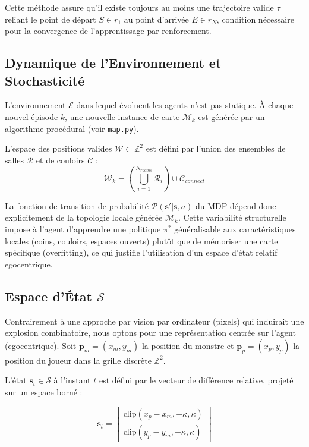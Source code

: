 \documentclass[12pt,a4paper]{article}
\newcommand{\state}{\mathbf{s}}
\newcommand{\action}{a}
\begin{document}
Cette méthode assure qu'il existe toujours au moins une trajectoire valide $\tau$ reliant le point de départ $S \in r_1$ au point d'arrivée $E \in r_N$, condition nécessaire pour la convergence de l'apprentissage par renforcement.

\subsection{Dynamique de l'Environnement et Stochasticité}
L'environnement $\mathcal{E}$ dans lequel évoluent les agents n'est pas statique. À chaque nouvel épisode $k$, une nouvelle instance de carte $\mathcal{M}_k$ est générée par un algorithme procédural (voir \texttt{map.py}).

L'espace des positions valides $\mathcal{W} \subset \mathbb{Z}^2$ est défini par l'union des ensembles de salles $\mathcal{R}$ et de couloirs $\mathcal{C}$ :
\begin{equation}
    \mathcal{W}_k = \left( \bigcup_{i=1}^{N_{rooms}} \mathcal{R}_i \right) \cup \mathcal{C}_{connect}
\end{equation}

La fonction de transition de probabilité $\mathcal{P}(\state'|\state, \action)$ du MDP dépend donc explicitement de la topologie locale générée $\mathcal{M}_k$. Cette variabilité structurelle impose à l'agent d'apprendre une politique $\pi^*$ généralisable aux caractéristiques locales (coins, couloirs, espaces ouverts) plutôt que de mémoriser une carte spécifique (overfitting), ce qui justifie l'utilisation d'un espace d'état relatif egocentrique.



\subsection{Espace d'État \texorpdfstring{$\mathcal{S}$}{S}}
Contrairement à une approche par vision par ordinateur (pixels) qui induirait une explosion combinatoire, nous optons pour une représentation centrée sur l'agent (egocentrique). Soit $\mathbf{p}_m = (x_m, y_m)$ la position du monstre et $\mathbf{p}_p = (x_p, y_p)$ la position du joueur dans la grille discrète $\mathbb{Z}^2$.

L'état $\state_t \in \mathcal{S}$ à l'instant $t$ est défini par le vecteur de différence relative, projeté sur un espace borné :

\begin{equation}
    \state_t = \begin{bmatrix}
        \text{clip}(x_p - x_m, -\kappa, \kappa) \\
        \text{clip}(y_p - y_m, -\kappa, \kappa)
    \end{bmatrix}
\end{equation}
\end{document}
